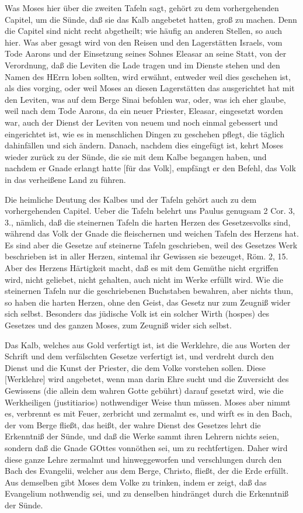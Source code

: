 Was Moses hier über die zweiten Tafeln sagt, gehört zu dem vorhergehenden Capitel, um die Sünde, daß sie das Kalb angebetet hatten, groß zu machen. Denn die Capitel sind nicht recht abgetheilt; wie häufig an anderen Stellen, so auch hier. Was aber gesagt wird von den Reisen und den Lagerstätten Israels, vom Tode Aarons und der Einsetzung seines Sohnes Eleasar an seine Statt, von der Verordnung, daß die Leviten die Lade tragen und im Dienste stehen und den Namen des HErrn loben sollten, wird erwähnt, entweder weil dies geschehen ist, als dies vorging, oder weil Moses an diesen Lagerstätten das ausgerichtet hat mit den Leviten, was auf dem Berge Sinai befohlen war, oder, was ich eher glaube, weil nach dem Tode Aarons, da ein neuer Priester, Eleasar, eingesetzt worden war, auch der Dienst der Leviten von neuem und noch einmal gebessert und eingerichtet ist, wie es in menschlichen Dingen zu geschehen pflegt, die täglich dahinfällen und sich ändern. Danach, nachdem dies eingefügt ist, kehrt Moses
wieder zurück zu der Sünde, die sie mit dem Kalbe begangen haben, und nachdem er Gnade erlangt hatte [für das Volk], empfängt er den Befehl, das Volk in das verheißene Land zu führen.

Die heimliche Deutung des Kalbes und der Tafeln gehört auch zu dem vorhergehenden Capitel. Ueber die Tafeln belehrt uns Paulus genugsam 2 Cor. 3, 3., nämlich, daß die steinernen Tafeln die harten Herzen des Gesetzesvolks sind, während das Volk der Gnade die fleischernen und weichen Tafeln des Herzens hat. Es sind aber die Gesetze auf steinerne Tafeln geschrieben, weil des Gesetzes Werk beschrieben ist in aller Herzen, sintemal ihr Gewissen sie bezeuget, Röm. 2, 15. Aber des Herzens Härtigkeit macht, daß es mit dem Gemüthe nicht ergriffen wird, nicht geliebet, nicht gehalten, auch nicht im Werke erfüllt wird. Wie die steinernen Tafeln nur die geschriebenen Buchstaben bewahren, aber nichts thun, so haben die harten Herzen, ohne den Geist, das Gesetz nur zum Zeugniß wider sich selbst. Besonders das jüdische Volk ist ein solcher Wirth (hospes) des Gesetzes und des ganzen Moses, zum Zeugniß wider sich selbst.

Das Kalb, welches aus Gold verfertigt ist, ist die Werklehre, die aus Worten der Schrift und dem verfälschten Gesetze verfertigt ist, und verdreht durch den Dienst und die Kunst der Priester, die dem Volke vorstehen sollen. Diese [Werklehre] wird angebetet, wenn man darin Ehre sucht und die Zuversicht des Gewissens (die allein dem wahren Gotte gebührt) darauf gesetzt wird, wie die Werkheiligen (justitiarios) nothwendiger Weise thun müssen. Moses aber nimmt es, verbrennt es mit Feuer, zerbricht und zermalmt es, und wirft es in den Bach, der vom Berge fließt, das heißt, der wahre Dienst des Gesetzes lehrt die Erkenntniß der Sünde, und daß die Werke sammt ihren Lehrern nichts seien, sondern daß die Gnade GOttes vonnöthen sei, um zu rechtfertigen. Daher wird diese ganze Lehre zermalmt und hinweggeworfen und verschlungen durch den Bach des Evangelii, welcher aus dem Berge, Christo, fließt, der die Erde erfüllt. Aus demselben gibt Moses dem Volke zu trinken, indem er zeigt, daß das Evangelium nothwendig sei, und zu denselben hindränget durch die Erkenntniß der Sünde.

